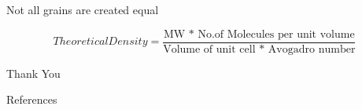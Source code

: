 \documentclass[10pt]{beamer}
\begin{document}
{%
\begin{frame}[fragile]{Not all grains are created equal}

\begin{equation*}
Theoretical Density = \dfrac{\text{MW * No.of Molecules per unit volume}}{\text{Volume of unit cell * Avogadro number}}
\end{equation*}   
    
\end{frame}
}




{
\begin{frame}[standout]
  Thank You
\end{frame}
}
\iffalse
\begin{frame}[fragile]{Backup slides}
\begin{figure}[H]
    \centering
    \begin{subfigure}[H]{0.40\textwidth}
        \texttt{[image: images/sem-cs-2]}
        
    \end{subfigure}
    ~
    \begin{subfigure}[H]{0.40\textwidth}
        \texttt{[image: images/sem-cs-4]}
    \end{subfigure}       
    \\
    \begin{subfigure}[H]{0.35\textwidth}
        \texttt{[image: images/sem-3]}
    \end{subfigure}      
     
\end{figure}
\end{frame}
\fi

\begin{frame}[allowframebreaks]{References}

  

\end{frame}
\end{document}
